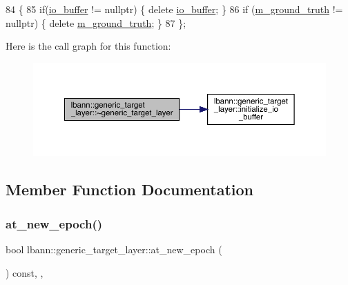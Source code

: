 \begin{DoxyCode}
84                                    \{
85     \textcolor{keywordflow}{if}(\hyperlink{classlbann_1_1generic__target__layer_a8da650b94f50cc63fc90cd792fa50c3f}{io\_buffer} != \textcolor{keyword}{nullptr}) \{ \textcolor{keyword}{delete} \hyperlink{classlbann_1_1generic__target__layer_a8da650b94f50cc63fc90cd792fa50c3f}{io\_buffer}; \}
86     \textcolor{keywordflow}{if} (\hyperlink{classlbann_1_1generic__target__layer_acb9ba351caf22b8e2378e4cd1e256da7}{m\_ground\_truth} != \textcolor{keyword}{nullptr}) \{ \textcolor{keyword}{delete} \hyperlink{classlbann_1_1generic__target__layer_acb9ba351caf22b8e2378e4cd1e256da7}{m\_ground\_truth}; \}
87   \};
\end{DoxyCode}
Here is the call graph for this function\+:\nopagebreak
\begin{figure}[H]
\begin{center}
\leavevmode
\includegraphics[width=350pt]{classlbann_1_1generic__target__layer_a899373681fe6ede57383da34fe4156c1_cgraph}
\end{center}
\end{figure}


\subsection{Member Function Documentation}
\mbox{\label{classlbann_1_1generic__target__layer_a9bdeadd84f0b4f31b755fdd338492b1a}} 
\subsubsection{\texorpdfstring{at\+\_\+new\+\_\+epoch()}{at\_new\_epoch()}}
{\footnotesize\ttfamily bool lbann\+::generic\+\_\+target\+\_\+layer\+::at\+\_\+new\+\_\+epoch (\begin{DoxyParamCaption}{ }\end{DoxyParamCaption}) const\hspace{0.3cm}{\ttfamily [inline]}, {\ttfamily [override]}, {\ttfamily [virtual]}}




